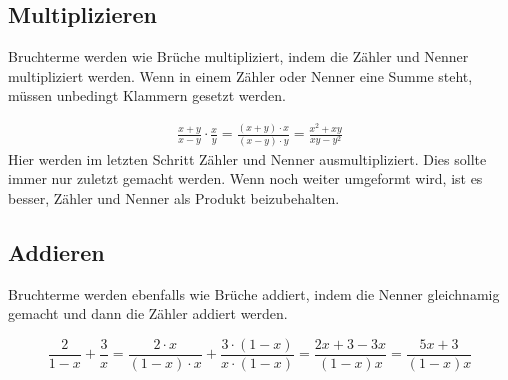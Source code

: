 \subsection{Multiplizieren}
Bruchterme werden wie Brüche multipliziert, indem die Zähler und Nenner multipliziert werden. Wenn in einem Zähler oder Nenner eine Summe steht, müssen unbedingt Klammern gesetzt werden.
\begin{example}
  \begin{align*}
    \frac{x+y}{x-y}\cdot \frac{x}{y} = \frac{(x+y)\cdot x}{(x-y)\cdot y} = \frac{x^{2}+xy}{xy-y^{2}}
  \end{align*}
  Hier werden im letzten Schritt Zähler und Nenner ausmultipliziert. Dies sollte immer nur zuletzt gemacht werden. Wenn noch weiter umgeformt wird, ist es besser, Zähler und Nenner als Produkt beizubehalten.
\end{example}

\subsection{Addieren}
Bruchterme werden ebenfalls wie Brüche addiert, indem die Nenner gleichnamig gemacht und dann die Zähler addiert werden.
\begin{example}
  \[
    \frac{2}{1-x}+ \frac{3}{x} = \frac{2\cdot x}{(1-x)\cdot x}+\frac{3\cdot (1-x)}{x\cdot (1-x)} = \frac{2x+3-3x}{(1-x)x} = \frac{5x+3}{(1-x)x}
  \]
\end{example}
